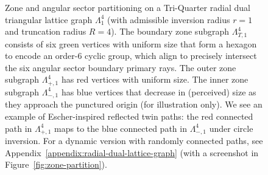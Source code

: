 \begin{figure}[htbp]
\caption{Zone and angular sector partitioning on a Tri-Quarter radial dual triangular lattice graph $\Lambda_1^4$ (with admissible inversion radius \(r = 1\) and truncation radius \(R=4\)). The boundary zone subgraph $\Lambda_{T,1}^4$ consists of six green vertices with uniform size that form a hexagon to encode an order-6 cyclic group, which align to precisely intersect the six angular sector boundary primary rays. The outer zone subgraph $\Lambda_{+,1}^4$ has red vertices with uniform size. The inner zone subgraph $\Lambda_{-,1}^4$ has blue vertices that decrease in (perceived) size as they approach the punctured origin (for illustration only). We see an example of Escher-inspired reflected twin paths: the red connected path in $\Lambda_{+,1}^4$ maps to the blue connected path in $\Lambda_{-,1}^4$ under circle inversion. For a dynamic version with randomly connected paths, see Appendix~\ref{appendix:radial-dual-lattice-graph} (with a screenshot in Figure~\ref{fig:zone-partition}).}
\label{fig:inverted-edge-original}
\vspace*{\fill}
\end{figure}